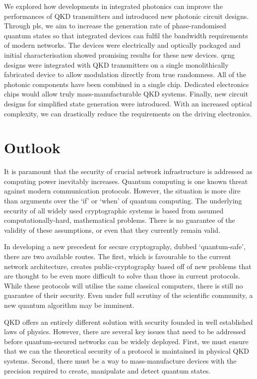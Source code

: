 We explored how developments in integrated photonics can improve the performances of \ac{QKD} transmitters and introduced new photonic circuit designs. Through \ac{pls}, we aim to increase the generation rate of phase-randomised quantum states so that integrated devices can fulfil the bandwidth requirements of modern networks. The devices were electrically and optically packaged and initial characterisation showed promising results for these new devices. \Ac{qrng} designs were integrated with \ac{QKD} transmitters on a single monolithically fabricated device to allow modulation directly from true randomness. All of the photonic components have been combined in a single chip. Dedicated electronics chips would allow truly mass-manufacturable \ac{QKD} systems. Finally, new circuit designs for simplified state generation were introduced. With an increased optical complexity, we can drastically reduce the requirements on the driving electronics.

\clearpage
\newpage
\section{Outlook}

It is paramount that the security of crucial network infrastructure is addressed as computing power inevitably increases. Quantum computing is one known threat against modern communication protocols. However, the situation is more dire than arguments over the `if' or `when' of quantum computing. The underlying security of all widely used cryptographic systems is based from assumed computationally-hard, mathematical problems. There is no guarantee of the validity of these assumptions, or even that they currently remain valid.

In developing a new precedent for secure cryptography, dubbed `quantum-safe', there are two available routes. The first, which is favourable to the current network architecture, creates public-cryptography based off of new problems that are thought to be even more difficult to solve than those in current protocols. While these protocols will utilise the same classical computers, there is still no guarantee of their security. Even under full scrutiny of the scientific community, a new quantum algorithm may be imminent. 

\Ac{QKD} offers an entirely different solution with security founded in well established laws of physics. However, there are several key issues that need to be addressed before quantum-secured networks can be widely deployed. First, we must ensure that we can the theoretical security of a protocol is maintained in physical \ac{QKD} systems. Second, there must be a way to mass-manufacture devices with the precision required to create, manipulate and detect quantum states. 

